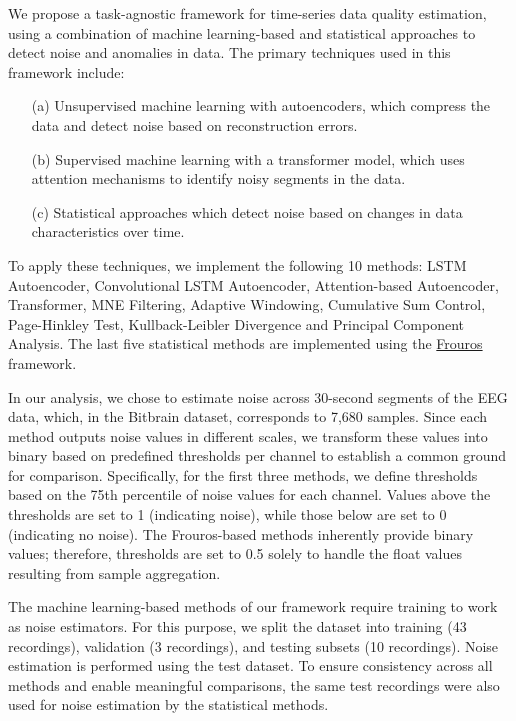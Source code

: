 We propose a task-agnostic framework for time-series data quality estimation, using a combination of machine learning-based and statistical approaches to detect noise and anomalies in data. The primary techniques used in this framework include:

\begin{enumerate}
    \item[(a)] Unsupervised machine learning with autoencoders, which compress the data and detect noise based on reconstruction errors.\\
    \vspace{-0.8cm}
    \item[(b)] Supervised machine learning with a transformer model, which uses attention mechanisms to identify noisy segments in the data.\\
    \vspace{-0.8cm}
    \item[(c)] Statistical approaches which detect noise based on changes in data characteristics over time.
\end{enumerate}

To apply these techniques, we implement the following 10 methods: LSTM Autoencoder, Convolutional LSTM Autoencoder, Attention-based Autoencoder, Transformer, MNE Filtering, Adaptive Windowing, Cumulative Sum Control, Page-Hinkley Test, Kullback-Leibler Divergence and Principal Component Analysis. The last five statistical methods are implemented using the \href{https://github.com/IFCA-Advanced-Computing/frouros}{Frouros} framework.

In our analysis, we chose to estimate noise across 30-second segments of the EEG data, which, in the Bitbrain dataset, corresponds to 7,680 samples. Since each method outputs noise values in different scales, we transform these values into binary based on predefined thresholds per channel to establish a common ground for comparison. Specifically, for the first three methods, we define thresholds based on the 75th percentile of noise values for each channel. Values above the thresholds are set to 1 (indicating noise), while those below are set to 0 (indicating no noise). The Frouros-based methods inherently provide binary values; therefore, thresholds are set to 0.5 solely to handle the float values resulting from sample aggregation.

The machine learning-based methods of our framework require training to work as noise estimators. For this purpose, we split the dataset into training (43 recordings), validation (3 recordings), and testing subsets (10 recordings). Noise estimation is performed using the test dataset. To ensure consistency across all methods and enable meaningful comparisons, the same test recordings were also used for noise estimation by the statistical methods.

